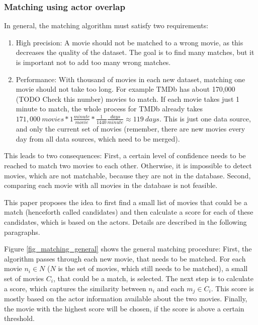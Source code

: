 \subsubsection{Matching using actor overlap}
In general, the matching algorithm must satisfy two requirements:
\begin{enumerate}
	\item{High precision:} A movie should not be matched to a wrong movie, as this decreases the quality of the dataset.
	The goal is to find many matches, but it is important not to add too many wrong matches.
	\item{Performance:} With thousand of movies in each new dataset, matching one movie should not take too long.
	For example TMDb has about 170,000 (TODO Check this number) movies to match.
	If each movie takes just 1 minute to match, the whole process for TMDb already takes $171,000~movies * 1 \frac{minute}{movie} * \frac{1}{1440} \frac{days}{minute} \approx 119~days$.
	This is just one data source, and only the current set of movies (remember, there are new movies every day from all data sources, which need to be merged).
\end{enumerate}

This leads to two consequences: First, a certain level of confidence needs to be reached to match two movies to each other. Otherwise, it is impossible to detect movies, which are not matchable, because they are not in the database.
Second, comparing each movie with all movies in the database is not feasible.

This paper proposes the idea to first find a small list of movies that could be a match (henceforth called candidates) and then calculate a score for each of these candidates, which is based on the actors.
Details are described in the following paragraphs.

Figure \ref{fig_matching_general} shows the general matching procedure:
First, the algorithm passes through each new movie, that needs to be matched.
For each movie $n_i \in N$ ($N$ is the set of movies, which still needs to be matched), a small set of movies $C_{i}$, that could be a match, is selected.
The next step is to calculate a score, which captures the similarity between $n_i$ and each $m_j \in C_i$.
This score is mostly based on the actor information available about the two movies.
Finally, the movie with the highest score will be chosen, if the score is above a certain threshold.

